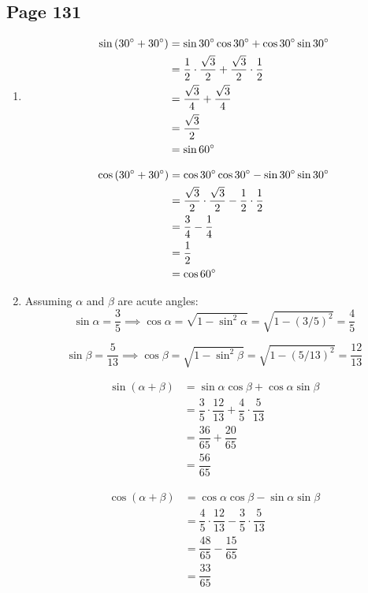 \documentclass{article}
\newenvironment{solutions}[1]
{\subsection*{#1}
 \begin{enumerate}[leftmargin=1.5em]}
{\end{enumerate}}
\newcommand{\solution}{\item}
\begin{document}
\begin{solutions}{Page 131}
\solution %
\begin{align*}
\sin\left(30\degree + 30\degree\right)
&= \sin{30\degree}\cos{30\degree} + \cos{30\degree}\sin{30\degree} \\
&= \dfrac{1}{2} \cdot \dfrac{\sqrt{3}}{2} + \dfrac{\sqrt{3}}{2} \cdot \dfrac{1}{2}\\
&= \dfrac{\sqrt{3}}{4} + \dfrac{\sqrt{3}}{4} \\
&= \dfrac{\sqrt{3}}{2} \\
&= \sin{60\degree}
\end{align*}

\begin{align*}
\cos\left(30\degree + 30\degree\right)
&= \cos{30\degree}\cos{30\degree} - \sin{30\degree}\sin{30\degree} \\
&= \dfrac{\sqrt{3}}{2} \cdot \dfrac{\sqrt{3}}{2} - \dfrac{1}{2} \cdot \dfrac{1}{2}\\
&= \dfrac{3}{4} - \dfrac{1}{4} \\
&= \dfrac{1}{2} \\
&= \cos{60\degree}
\end{align*}

\solution %
Assuming $\alpha$ and $\beta$ are acute angles:
\[
\sin{\alpha} = \dfrac{3}{5} \implies \cos{\alpha} = \sqrt{1-\sin^{2}{\alpha}} = \sqrt{1-\left(3/5\right)^2} = \dfrac{4}{5}
\]

\[
\sin{\beta} = \dfrac{5}{13} \implies \cos{\beta} = \sqrt{1-\sin^{2}{\beta}} = \sqrt{1-\left(5/13\right)^2} = \dfrac{12}{13}
\]

\begin{align*}
\sin\left(\alpha+\beta\right) &= \sin{\alpha}\cos{\beta} + \cos{\alpha}\sin{\beta} \\
&= \dfrac{3}{5} \cdot \dfrac{12}{13} + \dfrac{4}{5} \cdot \dfrac{5}{13} \\
&= \dfrac{36}{65} + \dfrac{20}{65} \\
&= \dfrac{56}{65}
\end{align*}

\begin{align*}
\cos\left(\alpha+\beta\right) &= \cos{\alpha}\cos{\beta} - \sin{\alpha}\sin{\beta} \\
&= \dfrac{4}{5} \cdot \dfrac{12}{13} - \dfrac{3}{5} \cdot \dfrac{5}{13} \\
&= \dfrac{48}{65} - \dfrac{15}{65} \\
&= \dfrac{33}{65}
\end{align*}


\end{solutions}
\end{document}
